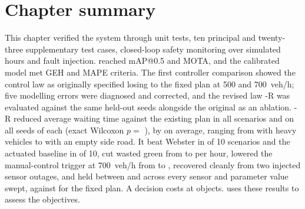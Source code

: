 \section{Chapter summary}

This chapter verified the system through  unit tests, ten principal and twenty-three supplementary test cases, closed-loop safety monitoring over  simulated hours and fault injection. \dtx{} reached  mAP@0.5 and  MOTA, and the calibrated model met GEH and MAPE criteria. The first controller comparison showed the control law as originally specified losing to the fixed plan at 500 and 700~veh/h; five modelling errors were diagnosed and corrected, and the revised law \prism{}-R was evaluated against the same held-out seeds alongside the original as an ablation. \prism{}-R reduced average waiting time against the existing plan in all  scenarios and on all  seeds of each (exact Wilcoxon $p =$ ), by  on average, ranging from  with heavy vehicles to  with an empty side road. It beat Webster in  of 10 scenarios and the actuated baseline in  of 10, cut wasted green from  to  per hour, lowered the manual-control trigger at 700~veh/h from  to , recovered cleanly from two injected sensor outages, and held between  and  across every sensor and parameter value swept, against  for the fixed plan. A decision costs  at  objects.  uses these results to assess the objectives.
